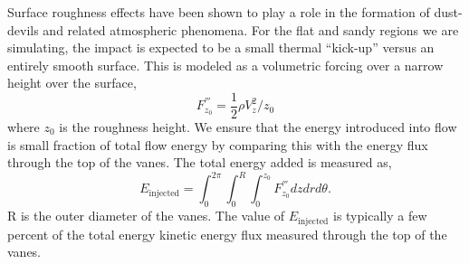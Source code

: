 Surface roughness effects have been shown to play a role in the
formation of dust-devils and related atmospheric
phenomena\cite{oke1987boundary}. For the flat and sandy regions we are
simulating, the impact is expected to be a small thermal ``kick-up''
versus an entirely smooth surface. This is modeled as a volumetric 
forcing over a narrow height over the surface, 
\begin{equation}
 F^{'''}_{z_0} = \frac{1}{2}\rho V_z^2/z_{0} 
\end{equation}
where $z_{0}$ is the roughness height. We ensure that the energy
introduced into flow is small fraction of total flow energy by comparing
this with the energy flux through the top of the vanes. The total energy
added is measured as,  
\begin{equation}
 E_{\text{injected}} = \int_0^{2\pi} \int_0^R \int_0^{z_0} F^{'''}_{z_0} dz dr d\theta. 
\end{equation}
R is the outer diameter of the vanes. 
The value of $E_{\text{injected}}$ is typically a few percent of the
total energy kinetic energy flux measured through the top of the
vanes.

